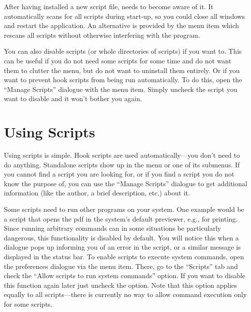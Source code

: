 After having installed a new script file, {\Tw} needs to become aware of it. It automatically scans for all scripts during start-up, so you could close all {\Tw} windows and restart the application. An alternative is provided by the \submenu{}\submenu{} menu item which rescans all scripts without otherwise interfering with the program.

You can also disable scripts (or whole directories of scripts) if you want to. This can be useful if you do not need some scripts for some time and do not want them to clutter the  menu, but do not want to uninstall them entirely. Or if you want to prevent hook scripts from being run automatically. To do this, open the ``Manage Scripts'' dialogue with the \submenu{}\submenu{} menu item. Simply uncheck the script you want to disable and it won't bother you again.

\section{Using Scripts}

Using scripts is simple. Hook scripts are used automatically---you don't need to do anything. Standalone scripts show up in the  menu or one of its submenus. If you cannot find a script you are looking for, or if you find a script you do not know the purpose of, you can use the ``Manage Scripts'' dialogue to get additional information (like the author, a brief description, etc.) about it. 

Some scripts need to run other programs on your system. One example would be a script that opens the pdf in the system's default previewer, e.g., for printing. Since running arbitrary commands can in some situations be particularly dangerous, this functionality is disabled by default. You will notice this when a dialogue pops up informing you of an error in the script, or a similar message is displayed in the status bar. To enable scripts to execute system commands, open the preferences dialogue via the \submenu{} menu item. There, go to the ``Scripts'' tab and check the ``Allow scripts to run system commands'' option. If you want to disable this function again later just uncheck the option. Note that this option applies equally to all scripts---there is currently no way to allow command execution only for some scripts.
